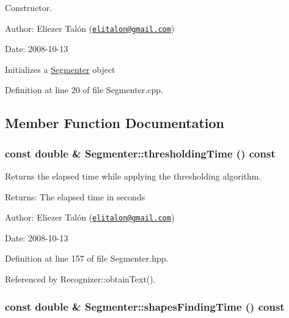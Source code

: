 Constructor. 

\begin{Desc}
\item[Author:]Eliezer Talón (\href{mailto:elitalon@gmail.com}{\tt elitalon@gmail.com}) \end{Desc}
\begin{Desc}
\item[Date:]2008-10-13\end{Desc}
Initializes a \hyperlink{class_segmenter}{Segmenter} object 

Definition at line 20 of file Segmenter.cpp.

\subsection{Member Function Documentation}
\hypertarget{class_segmenter_52f771c61d667df4f552ee73dc9f22e7}{
\subsubsection[thresholdingTime]{\setlength{\rightskip}{0pt plus 5cm}const double \& Segmenter::thresholdingTime () const}}
\label{class_segmenter_52f771c61d667df4f552ee73dc9f22e7}


Returns the elapsed time while applying the thresholding algorithm. 

\begin{Desc}
\item[Returns:]The elapsed time in seconds\end{Desc}
\begin{Desc}
\item[Author:]Eliezer Talón (\href{mailto:elitalon@gmail.com}{\tt elitalon@gmail.com}) \end{Desc}
\begin{Desc}
\item[Date:]2008-10-13 \end{Desc}


Definition at line 157 of file Segmenter.hpp.

Referenced by Recognizer::obtainText().\hypertarget{class_segmenter_53761a65661587c45e34988b90401888}{
\subsubsection[shapesFindingTime]{\setlength{\rightskip}{0pt plus 5cm}const double \& Segmenter::shapesFindingTime () const}}
\label{class_segmenter_53761a65661587c45e34988b90401888}


